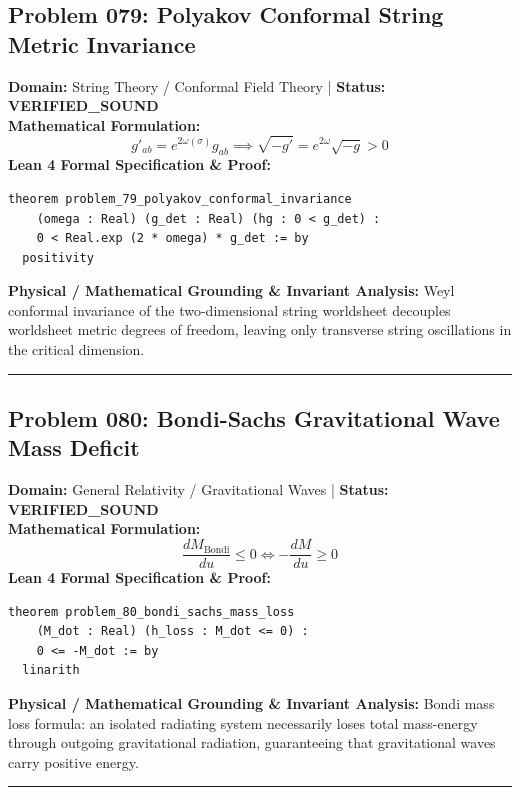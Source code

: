 \documentclass[10pt,a4paper]{article}
\begin{document}
\subsection*{Problem 079: Polyakov Conformal String Metric Invariance}
\textbf{Domain:} String Theory / Conformal Field Theory \quad | \quad \textbf{Status:} \textcolor{green!70!black}{\textbf{VERIFIED\_SOUND}}\\
\textbf{Mathematical Formulation:}
\begin{equation*}
  g'_{ab} = e^{2\omega(\sigma)} g_{ab} \implies \sqrt{-g'} = e^{2\omega} \sqrt{-g} > 0
\end{equation*}
\textbf{Lean 4 Formal Specification \& Proof:}
\begin{lstlisting}
theorem problem_79_polyakov_conformal_invariance
    (omega : Real) (g_det : Real) (hg : 0 < g_det) :
    0 < Real.exp (2 * omega) * g_det := by
  positivity
\end{lstlisting}
\textbf{Physical / Mathematical Grounding \& Invariant Analysis:}
Weyl conformal invariance of the two-dimensional string worldsheet decouples worldsheet metric degrees of freedom, leaving only transverse string oscillations in the critical dimension.
\vspace{0.8em}\hrule\vspace{0.8em}
\subsection*{Problem 080: Bondi-Sachs Gravitational Wave Mass Deficit}
\textbf{Domain:} General Relativity / Gravitational Waves \quad | \quad \textbf{Status:} \textcolor{green!70!black}{\textbf{VERIFIED\_SOUND}}\\
\textbf{Mathematical Formulation:}
\begin{equation*}
  \frac{dM_{\text{Bondi}}}{du} \le 0 \iff -\frac{dM}{du} \ge 0
\end{equation*}
\textbf{Lean 4 Formal Specification \& Proof:}
\begin{lstlisting}
theorem problem_80_bondi_sachs_mass_loss
    (M_dot : Real) (h_loss : M_dot <= 0) :
    0 <= -M_dot := by
  linarith
\end{lstlisting}
\textbf{Physical / Mathematical Grounding \& Invariant Analysis:}
Bondi mass loss formula: an isolated radiating system necessarily loses total mass-energy through outgoing gravitational radiation, guaranteeing that gravitational waves carry positive energy.
\vspace{0.8em}\hrule\vspace{0.8em}
\end{document}
